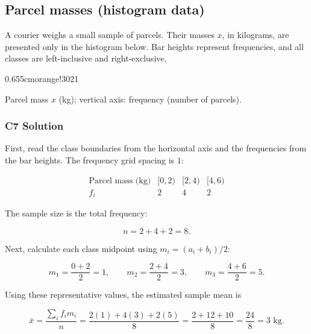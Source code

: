 \subsection{Parcel masses (histogram data)}
\label{sec:c7-only-histogram}

A courier weighs a small sample of parcels. Their masses $x$, in kilograms,
are presented only in the histogram below. Bar heights represent frequencies,
and all classes are left-inclusive and right-exclusive.

    {0.65\textwidth}{5cm}{orange!30}{2}{1}

\begin{center}
    Parcel mass $x$ (kg); vertical axis: frequency (number of parcels).
\end{center}


\subsubsection*{C7 Solution}
\label{subsec:c7-only-histogram-solution}

First, read the class boundaries from the horizontal axis and the frequencies
from the bar heights. The frequency grid spacing is $1$:

\[
\begin{array}{c|ccc}
    \text{Parcel mass (kg)} & [0,2) & [2,4) & [4,6) \\ \hline
    f_i & 2 & 4 & 2
\end{array}
\]

The sample size is the total frequency:

\[
n=2+4+2=8.
\]

Next, calculate each class midpoint using $m_i=(a_i+b_i)/2$:

\[
m_1=\frac{0+2}{2}=1,\qquad
m_2=\frac{2+4}{2}=3,\qquad
m_3=\frac{4+6}{2}=5.
\]

Using these representative values, the estimated sample mean is

\[
\bar{x}=\frac{\sum_i f_i m_i}{n}
=\frac{2(1)+4(3)+2(5)}{8}
=\frac{2+12+10}{8}
=\frac{24}{8}=3\text{ kg}.
\]

